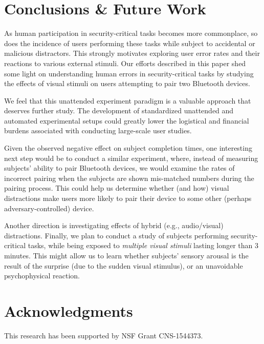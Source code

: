 \documentclass{llncs}
\begin{document}

\section{Conclusions \& Future Work}
\label{sec:future}
%
As human participation in security-critical tasks becomes more commonplace, so does the incidence
of users performing these tasks while subject to accidental or malicious distractors. This strongly 
motivates exploring user error rates and their reactions to various external stimuli.
Our efforts described in this paper shed some light on understanding human errors in 
security-critical tasks by studying the effects of visual stimuli on users attempting 
to pair two Bluetooth devices.

We feel that this unattended experiment paradigm is a valuable approach that deserves further study. 
The development of standardized unattended and automated experimental setups could greatly lower the 
logistical and financial burdens associated with conducting large-scale user studies.

Given the observed negative effect on subject completion times, one interesting next step 
would be to conduct a similar experiment, where, instead of measuring
subjects' ability to pair Bluetooth devices, we would examine the rates of incorrect pairing when
the subjects are shown mis-matched numbers during the pairing process. 
This could help us determine whether (and how) visual distractions make users more likely to 
pair their device to some other (perhaps adversary-controlled) device.

Another direction is investigating effects of hybrid (e.g., audio/visual) distractions. 
Finally, we plan to conduct a study of subjects performing security-critical tasks,  while being
exposed to {\em multiple visual stimuli} lasting longer than 3 minutes. This might allow us
to learn whether subjects' sensory arousal is the result of the surprise (due to the sudden 
visual stimulus), or an unavoidable psychophysical reaction.

\section*{Acknowledgments}
\label{sec:ack}
This research has been supported by NSF Grant CNS-1544373. 
 
% 

\end{document}
